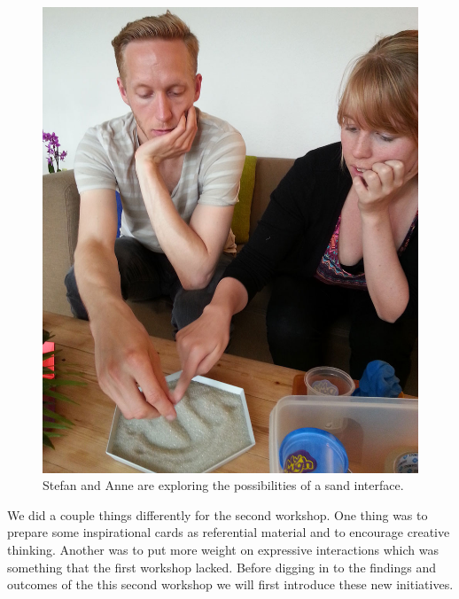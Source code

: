 \begin{figure}[h]
  \centering
  \begin{minipage}[b]{.8\textwidth}
    \centering
    \includegraphics[width=.7\linewidth]{figures/stefan_anne}
  \caption{Stefan and Anne are exploring the possibilities of a sand interface.}
   \label{stefan_anne}
   \end{minipage}
\end{figure}

We did a couple things differently for the second workshop.
One thing was to prepare some inspirational cards as referential material and to encourage creative thinking.
Another was to put more weight on expressive interactions which was something that the first workshop lacked.
Before digging in to the findings and outcomes of the this second workshop we will first introduce these new initiatives.

